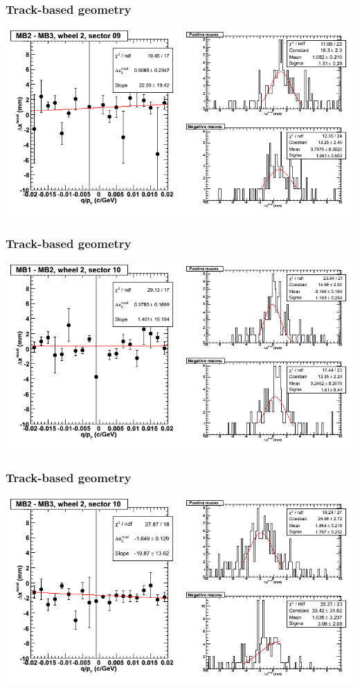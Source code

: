 \documentclass[compress]{beamer}
\begin{document}
\begin{frame}
\frametitle{Track-based geometry}
\includegraphics[width=\linewidth]{NOV4_segdiffs/dt13_resid_E_09_23.png}
\end{frame}

\begin{frame}
\frametitle{Track-based geometry}
\includegraphics[width=\linewidth]{NOV4_segdiffs/dt13_resid_E_10_12.png}
\end{frame}

\begin{frame}
\frametitle{Track-based geometry}
\includegraphics[width=\linewidth]{NOV4_segdiffs/dt13_resid_E_10_23.png}
\end{frame}
\end{document}

